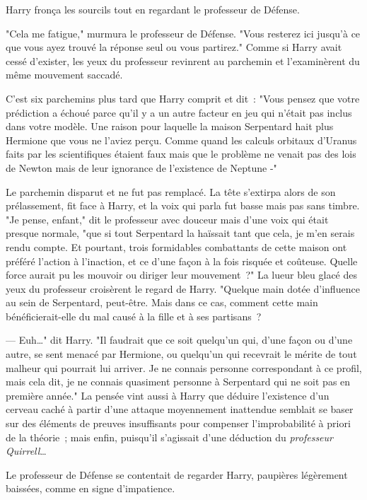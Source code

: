 Harry fronça les sourcils tout en regardant le professeur de Défense.

"Cela me fatigue," murmura le professeur de Défense. "Vous resterez ici jusqu'à ce que vous ayez trouvé la réponse seul ou vous partirez." Comme si Harry avait cessé d'exister, les yeux du professeur revinrent au parchemin et l'examinèrent du même mouvement saccadé.

C'est six parchemins plus tard que Harry comprit et dit~: "Vous pensez que votre prédiction a échoué parce qu'il y a un autre facteur en jeu qui n'était pas inclus dans votre modèle. Une raison pour laquelle la maison Serpentard hait plus Hermione que vous ne l'aviez perçu. Comme quand les calculs orbitaux d'Uranus faits par les scientifiques étaient faux mais que le problème ne venait pas des lois de Newton mais de leur ignorance de l'existence de Neptune -"

Le parchemin disparut et ne fut pas remplacé. La tête s'extirpa alors de son prélassement, fit face à Harry, et la voix qui parla fut basse mais pas sans timbre. "Je pense, enfant," dit le professeur avec douceur mais d'une voix qui était presque normale, "que si tout Serpentard la haïssait tant que cela, je m'en serais rendu compte. Et pourtant, trois formidables combattants de cette maison ont préféré l'action à l'inaction, et ce d'une façon à la fois risquée et coûteuse. Quelle force aurait pu les mouvoir ou diriger leur mouvement~?" La lueur bleu glacé des yeux du professeur croisèrent le regard de Harry. "Quelque main dotée d'influence au sein de Serpentard, peut-être. Mais dans ce cas, comment cette main bénéficierait-elle du mal causé à la fille et à ses partisans~?

--- Euh…" dit Harry. "Il faudrait que ce soit quelqu'un qui, d'une façon ou d'une autre, se sent menacé par Hermione, ou quelqu'un qui recevrait le mérite de tout malheur qui pourrait lui arriver. Je ne connais personne correspondant à ce profil, mais cela dit, je ne connais quasiment personne à Serpentard qui ne soit pas en première année." La pensée vint aussi à Harry que déduire l'existence d'un cerveau caché à partir d'une attaque moyennement inattendue semblait se baser sur des éléments de preuves insuffisants pour compenser l'improbabilité à priori de la théorie~; mais enfin, puisqu'il s'agissait d'une déduction du \emph{professeur Quirrell}…

Le professeur de Défense se contentait de regarder Harry, paupières légèrement baissées, comme en signe d'impatience.

